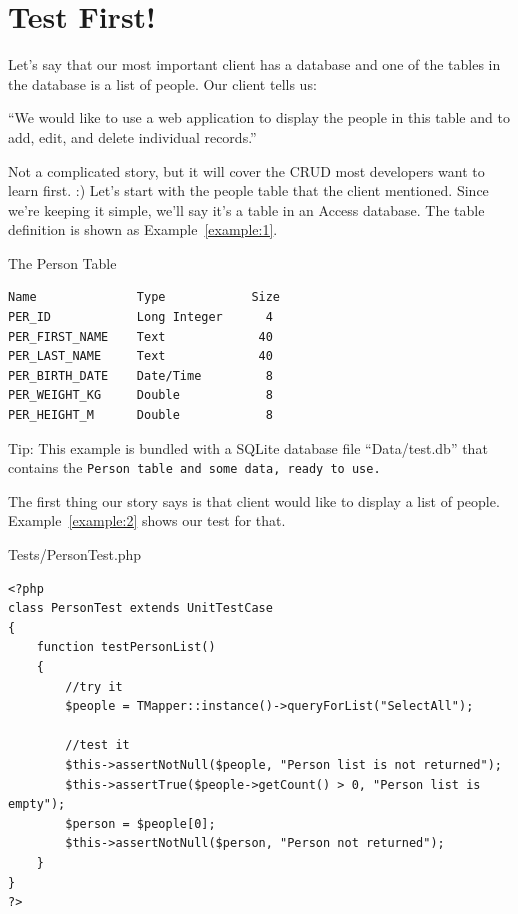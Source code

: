 \section{Test First!}

Let's say that our most important client has a database and one of the tables
in the database is a list of people. Our client tells us:

``We would like to use a web application to display the people in this table
and to add, edit, and delete individual records.''

Not a complicated story, but it will cover the CRUD most developers want to
learn first. :) Let's start with the people table that the client mentioned.
Since we're keeping it simple, we'll say it's a table in an Access database.
The table definition is shown as Example~\ref{example:1}.

\begin{example}\label{example:1}
The Person Table
\begin{verbatim}
Name              Type            Size
PER_ID            Long Integer      4
PER_FIRST_NAME    Text             40
PER_LAST_NAME     Text             40
PER_BIRTH_DATE    Date/Time         8
PER_WEIGHT_KG     Double            8
PER_HEIGHT_M      Double            8
\end{verbatim}
\end{example}

\begin{mybox}{Tip:}
    This example is bundled with a SQLite database file ``Data/test.db''
    that contains the \tt{Person} table and some data, ready to use.
\end{mybox}

The first thing our story says is that client would like to display a list of
people. Example~\ref{example:2} shows our test for that.

\begin{example}\label{example:2}
Tests/PersonTest.php
\begin{verbatim}
<?php
class PersonTest extends UnitTestCase
{
    function testPersonList()
    {
        //try it
        $people = TMapper::instance()->queryForList("SelectAll");

        //test it
        $this->assertNotNull($people, "Person list is not returned");
        $this->assertTrue($people->getCount() > 0, "Person list is empty");
        $person = $people[0];
        $this->assertNotNull($person, "Person not returned");
    }
}
?>
\end{verbatim}
\end{example}

